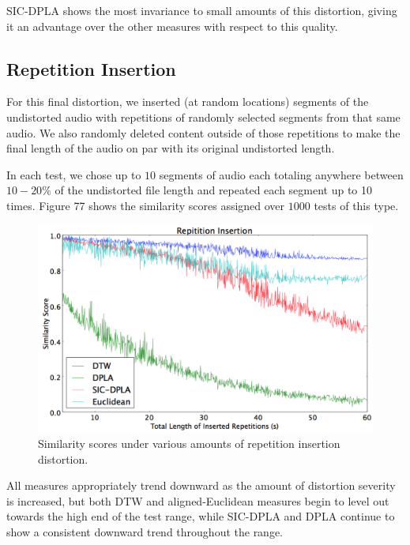 \documentclass[12pt]{report} 	%
\numberwithin{figure}{chapter}
\numberwithin{table}{chapter}
\numberwithin{equation}{chapter}
\begin{document}
\begin{flushleft}
SIC-DPLA shows the most invariance to small amounts of this distortion, giving it an advantage over the other measures with respect to this quality.

\vspace{12pt}
\subsection{Repetition Insertion}
For this final distortion, we inserted (at random locations) segments of the undistorted audio with repetitions of randomly selected segments from that same audio. We also randomly deleted content outside of those repetitions to make the final length of the audio on par with its original undistorted length.

In each test, we chose up to $10$ segments of audio each totaling anywhere between $10-20\%$ of the undistorted file length and repeated each segment up to 10 times. Figure 77 shows the similarity scores assigned over $1000$ tests of this type.
\begin{figure}[h!]
\vspace{24pt}\begin{center}
\includegraphics[scale=0.5,width=\linewidth]{RepetitionInsertion}
\caption[Repetition insertion results]{Similarity scores under various amounts of repetition insertion distortion.}
\end{center}
\vspace{6pt}
\end{figure}

All measures appropriately trend downward as the amount of distortion severity is increased, but both DTW and aligned-Euclidean measures begin to level out towards the high end of the test range, while SIC-DPLA and DPLA continue to show a consistent downward trend throughout the range. 


\end{flushleft}
\end{document}
